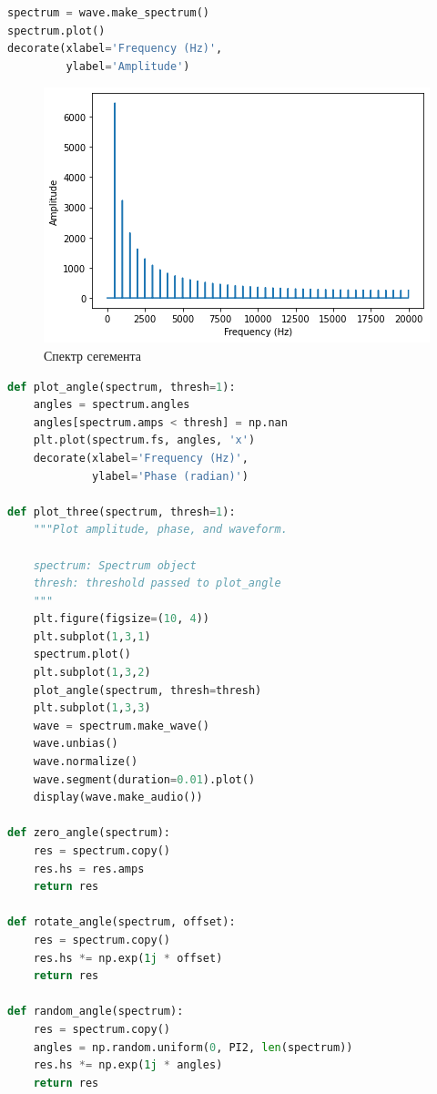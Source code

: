 \begin{lstlisting}[language=Python]
spectrum = wave.make_spectrum()
spectrum.plot()
decorate(xlabel='Frequency (Hz)',
         ylabel='Amplitude')
\end{lstlisting}
\begin{figure}[H]
	\begin{center}
		\includegraphics[scale=1]{fig/lab06/lab06_42_0.png}
		\caption{Спектр сегемента}
	\end{center}
\end{figure}

\begin{lstlisting}[language=Python]
def plot_angle(spectrum, thresh=1):
    angles = spectrum.angles
    angles[spectrum.amps < thresh] = np.nan
    plt.plot(spectrum.fs, angles, 'x')
    decorate(xlabel='Frequency (Hz)', 
             ylabel='Phase (radian)')
             
def plot_three(spectrum, thresh=1):
    """Plot amplitude, phase, and waveform.
    
    spectrum: Spectrum object
    thresh: threshold passed to plot_angle
    """
    plt.figure(figsize=(10, 4))
    plt.subplot(1,3,1)
    spectrum.plot()
    plt.subplot(1,3,2)
    plot_angle(spectrum, thresh=thresh)
    plt.subplot(1,3,3)
    wave = spectrum.make_wave()
    wave.unbias()
    wave.normalize()
    wave.segment(duration=0.01).plot()
    display(wave.make_audio())

def zero_angle(spectrum):
    res = spectrum.copy()
    res.hs = res.amps
    return res
    
def rotate_angle(spectrum, offset):
    res = spectrum.copy()
    res.hs *= np.exp(1j * offset)
    return res

def random_angle(spectrum):
    res = spectrum.copy()
    angles = np.random.uniform(0, PI2, len(spectrum))
    res.hs *= np.exp(1j * angles)
    return res
\end{lstlisting}

